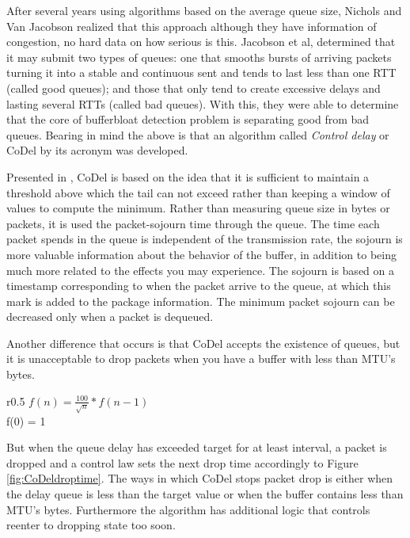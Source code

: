 After several years using algorithms based on the average queue size, Nichols
and Van Jacobson realized that this approach although they have information of
congestion, no hard data on how serious is this. Jacobson et al, determined
that it may submit two types of queues: one that smooths bursts of arriving
packets turning it into a stable and continuous sent and tends to last less
than one RTT (called good queues); and those that only tend to create
excessive delays and lasting several RTTs (called bad queues). With this, they
were able to determine that the core of bufferbloat detection problem is
separating good from bad queues. Bearing in mind the above is that an
algorithm called \textit{Control delay} or CoDel by its acronym was
developed.

Presented in \cite{NicholsJacobsonCQD}, CoDel is based on the idea that it is
sufficient to maintain a threshold above which the tail can not exceed rather
than keeping a window of values to compute the minimum. Rather than measuring
queue size in bytes or packets, it is used the packet-sojourn time through the
queue. The time each packet spends in the queue is independent of the
transmission rate, the \gls{sojourn} is more valuable information about the behavior
of the buffer, in addition to being much more related to the effects you may
experience. The sojourn is based on a timestamp corresponding to when the
packet arrive to the queue, at which this mark is added to the package
information. The minimum packet sojourn can be decreased only when a packet is
dequeued.

Another difference that occurs is that CoDel accepts the existence of queues,
but it is unacceptable to drop packets when you have a buffer with less than
\gls{MTU}'s bytes.

\begin{wrapfigure}{r}{0.5\textwidth}
    \centering
	$f(n) = \frac{100}{\sqrt{n}}*f(n-1)$ \\
	f(0) = 1
    \caption[CoDel droptime interval]{CoDel droptime interval, n=iteration}
    \label{fig:CoDeldroptime}
\end{wrapfigure}

But when the queue delay has exceeded target for at least interval, a packet
is dropped and a control law sets the next drop time accordingly to Figure
\ref{fig:CoDeldroptime}. The ways in which CoDel stops packet drop is either
when the delay queue is less than the target value or when the buffer contains
less than MTU's bytes. Furthermore the algorithm has additional logic that
controls reenter to dropping state too soon.


